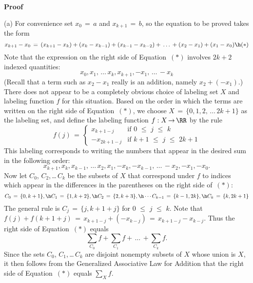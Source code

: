 \V

        {\bf Proof}

\V

        (a) For convenience set $x_{0} \,=\, a$ and $x_{k+1} \,=\, b$, so the equation to be proved takes the form
        \begin{displaymath}
        x_{k+1}-x_{0} \,=\, (x_{k+1}-x_{k}) + (x_{k}-x_{k-1}) + (x_{k-1}-x_{k-2}) + \,{\ldots}\, + (x_{2}-x_{1}) + (x_{1}-x_{0}) \h ({\ast})
        \end{displaymath}
    Note that the expression on the right side of Equation~$({\ast})$ involves $2k+2$ indexed quantities:
        \begin{displaymath}
        x_{0}, x_{1},\,{\ldots}\,x_{k},x_{k+1}, -x_{1},\,{\ldots}\,-x_{k}
        \end{displaymath}
    (Recall that a term such as $x_{2}-x_{1}$ really is an addition, namely $x_{2} + (-x_{1})$.)
    There does not appear to be a completely obvious choice of labeling set $X$ and labeling function $f$ for this situation.
    Based on the order in which the terms are written on the right side of Equation~$({\ast})$,
    we choose $X \,=\, \{0,1,2,\,{\ldots}\,2k+1\}$ as the labeling set, and define the labeling function $f:X \,{\rightarrow}\, {\RR}$ by the rule
        \begin{displaymath}
        f(j) \,=\, \left\{
        \begin{array}{rl}
        x_{k+1-j} & \mbox{if $0\,\,{\leq}\,\,j\,\,{\leq}\,\,k$} \\
       -x_{2k+1-j} & \mbox{if $k+1\,\,{\leq}\,\,j\,\,{\leq}\,\,2k+1$}
        \end{array}
                            \right.
        \end{displaymath}
    This labeling corresponds to writing the numbers that appear in the desired sum in the following order:
        \begin{displaymath}
        x_{k+1}, x_{k}, x_{k-1},\,{\ldots}\,x_{2},x_{1}, -x_{k}, -x_{k-1},\,{\ldots}\,-x_{2}, -x_{1}, -x_{0}.
        \end{displaymath}
    Now let $C_{0}$, $C_{2}$,\,{\ldots}\,$C_{k}$ be the subsets of $X$ that correspond under $f$ to indices which appear in the differences in the parentheses on the right side of~$({\ast})$:
        \begin{displaymath}
        C_{0} \,=\, \{0,k+1\}, \h C_{1} \,=\, \{1,k+2\}, \h C_{2} \,=\, \{2, k+3\}, \h  \,{\cdots}\, C_{k-1} \,=\, \{k-1, 2k\}, \h C_{k}  \,=\, \{k,2k+1\}
        \end{displaymath}
    The general rule is $C_{j} \,=\, \{j, k+1+j\}$ for $0\,\,{\leq}\,\,j\,\,{\leq}\,\,k$.
    Note that $f(j) + f(k+1+j) \,=\, x_{k+1-j} + (-x_{k-j}) \,=\, x_{k+1-j}-x_{k-j}$.
    Thus the right side of Equation~$({\ast})$ equals
        \begin{displaymath}
        {\sum}_{C_{0}} f + {\sum}_{C_{1}} f + \,{\ldots}\, + {\sum}_{C_{k}} f.
        \end{displaymath}
    Since the sets $C_{0}$, $C_{1}$,\,{\ldots}\,$C_{k}$ are disjoint nonempty subsets of $X$ whose union is $X$, it then follows from the Generalized Associative Law for Addition that the right side of Equation~$({\ast})$ equals ${\sum}_{X} f$.

